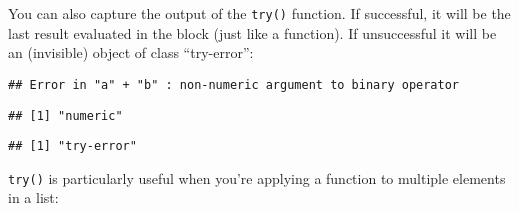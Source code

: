 You can also capture the output of the \texttt{try()} function. If
successful, it will be the last result evaluated in the block (just like
a function). If unsuccessful it will be an (invisible) object of class
``try-error'':

\begin{Shaded}
\begin{Highlighting}[]
\StringTok{ }\NormalTok{(} \OperatorTok{+}\StringTok{ }\NormalTok{)}
\StringTok{ }\NormalTok{(} \OperatorTok{+}\NormalTok{)}
\end{Highlighting}
\end{Shaded}

\begin{verbatim}
## Error in "a" + "b" : non-numeric argument to binary operator
\end{verbatim}

\begin{Shaded}
\begin{Highlighting}[]
\end{Highlighting}
\end{Shaded}

\begin{verbatim}
## [1] "numeric"
\end{verbatim}

\begin{Shaded}
\begin{Highlighting}[]
\end{Highlighting}
\end{Shaded}

\begin{verbatim}
## [1] "try-error"
\end{verbatim}

\texttt{try()} is particularly useful when you're applying a function to
multiple elements in a list:

\begin{Shaded}
\begin{Highlighting}[]
\StringTok{ }\NormalTok{(}\OperatorTok{:}\NormalTok{, }\NormalTok{(}\OperatorTok{-}\NormalTok{, }\NormalTok{), }\NormalTok{(}\NormalTok{, }
\StringTok{ }
\end{Highlighting}
\end{Shaded}

